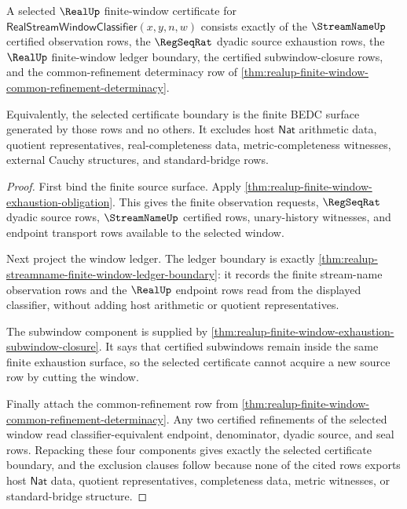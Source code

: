 \begin{theorem}
\label{thm:realup-selected-window-certificate-boundary}
A selected $\RealUp$ finite-window certificate for
$\mathsf{RealStreamWindowClassifier}(x,y,n,w)$ consists exactly of the
$\StreamNameUp$ certified observation rows, the $\RegSeqRat$ dyadic source
exhaustion rows, the $\RealUp$ finite-window ledger boundary, the certified
subwindow-closure rows, and the common-refinement determinacy row of
\autoref{thm:realup-finite-window-common-refinement-determinacy}.

Equivalently, the selected certificate boundary is the finite BEDC surface
generated by those rows and no others. It excludes host $\mathsf{Nat}$
arithmetic data, quotient representatives, real-completeness data,
metric-completeness witnesses, external Cauchy structures, and standard-bridge
rows.
\end{theorem}
\begin{proof}
First bind the finite source surface. Apply
\autoref{thm:realup-finite-window-exhaustion-obligation}. This gives the
finite observation requests, $\RegSeqRat$ dyadic source rows,
$\StreamNameUp$ certified rows, unary-history witnesses, and endpoint
transport rows available to the selected window.

Next project the window ledger. The ledger boundary is exactly
\autoref{thm:realup-streamname-finite-window-ledger-boundary}: it records the
finite stream-name observation rows and the $\RealUp$ endpoint rows read from
the displayed classifier, without adding host arithmetic or quotient
representatives.

The subwindow component is supplied by
\autoref{thm:realup-finite-window-exhaustion-subwindow-closure}. It says that
certified subwindows remain inside the same finite exhaustion surface, so the
selected certificate cannot acquire a new source row by cutting the window.

Finally attach the common-refinement row from
\autoref{thm:realup-finite-window-common-refinement-determinacy}. Any two
certified refinements of the selected window read classifier-equivalent
endpoint, denominator, dyadic source, and seal rows. Repacking these four
components gives exactly the selected certificate boundary, and the exclusion
clauses follow because none of the cited rows exports host $\mathsf{Nat}$
data, quotient representatives, completeness data, metric witnesses, or
standard-bridge structure.
\end{proof}

